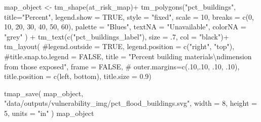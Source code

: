 \documentclass[
  letterpaper,
  DIV=11,
  numbers=noendperiod]{scrartcl}
\newenvironment{Shaded}{}{}
\newcommand{\AttributeTok}[1]{\textcolor[rgb]{0.84,0.23,0.29}{#1}}
\newcommand{\CommentTok}[1]{\textcolor[rgb]{0.42,0.45,0.49}{#1}}
\newcommand{\ConstantTok}[1]{\textcolor[rgb]{0.00,0.36,0.77}{#1}}
\newcommand{\DecValTok}[1]{\textcolor[rgb]{0.00,0.36,0.77}{#1}}
\newcommand{\FloatTok}[1]{\textcolor[rgb]{0.00,0.36,0.77}{#1}}
\newcommand{\FunctionTok}[1]{\textcolor[rgb]{0.44,0.26,0.76}{#1}}
\newcommand{\NormalTok}[1]{\textcolor[rgb]{0.14,0.16,0.18}{#1}}
\newcommand{\OtherTok}[1]{\textcolor[rgb]{0.44,0.26,0.76}{#1}}
\newcommand{\SpecialCharTok}[1]{\textcolor[rgb]{0.00,0.36,0.77}{#1}}
\newcommand{\StringTok}[1]{\textcolor[rgb]{0.01,0.18,0.38}{#1}}
\begin{document}
\begin{Shaded}
\begin{Highlighting}[]
\NormalTok{map\_object }\OtherTok{\textless{}{-}}
\FunctionTok{tm\_shape}\NormalTok{(at\_risk\_map)}\SpecialCharTok{+}
  \FunctionTok{tm\_polygons}\NormalTok{(}\StringTok{"pct\_buildings"}\NormalTok{,}
              \AttributeTok{title=}\StringTok{"Percent"}\NormalTok{, }
              \AttributeTok{legend.show =} \ConstantTok{TRUE}\NormalTok{,}
              \AttributeTok{style =} \StringTok{"fixed"}\NormalTok{,}
              \AttributeTok{scale =} \DecValTok{10}\NormalTok{,}
              \AttributeTok{breaks =} \FunctionTok{c}\NormalTok{(}\DecValTok{0}\NormalTok{, }\DecValTok{10}\NormalTok{, }\DecValTok{20}\NormalTok{, }\DecValTok{30}\NormalTok{, }\DecValTok{40}\NormalTok{, }\DecValTok{50}\NormalTok{, }\DecValTok{60}\NormalTok{),}
              \AttributeTok{palette =} \StringTok{"Blues"}\NormalTok{,}
              \AttributeTok{textNA =} \StringTok{"Unavailable"}\NormalTok{,}
              \AttributeTok{colorNA =} \StringTok{"grey"}
\NormalTok{              ) }\SpecialCharTok{+}
  \FunctionTok{tm\_text}\NormalTok{(}\FunctionTok{c}\NormalTok{(}\StringTok{"pct\_buildings\_label"}\NormalTok{), }\AttributeTok{size =}\NormalTok{ .}\DecValTok{7}\NormalTok{, }\AttributeTok{col =} \StringTok{"black"}\NormalTok{)}\SpecialCharTok{+}
  \FunctionTok{tm\_layout}\NormalTok{(}
    \CommentTok{\#legend.outside = TRUE,}
    \AttributeTok{legend.position =} \FunctionTok{c}\NormalTok{(}\StringTok{"right"}\NormalTok{, }\StringTok{"top"}\NormalTok{),}
    \CommentTok{\#title.snap.to.legend = FALSE,}
    \AttributeTok{title =} 
      \StringTok{"Percent building materials}\SpecialCharTok{\textbackslash{}n}\StringTok{dimension from those exposed"}\NormalTok{,}
    \AttributeTok{frame =} \ConstantTok{FALSE}\NormalTok{,}
\CommentTok{\#            outer.margins=c(.10,.10, .10, .10), }
            \AttributeTok{title.position =} \FunctionTok{c}\NormalTok{(}\StringTok{\textquotesingle{}left\textquotesingle{}}\NormalTok{, }\StringTok{\textquotesingle{}bottom\textquotesingle{}}\NormalTok{),}
            \AttributeTok{title.size =} \FloatTok{0.9}\NormalTok{)}

\FunctionTok{tmap\_save}\NormalTok{(}
\NormalTok{  map\_object,}
  \StringTok{"data/outputs/vulnerability\_img/pct\_flood\_buildings.svg"}\NormalTok{,}
  \AttributeTok{width =} \DecValTok{8}\NormalTok{,}
  \AttributeTok{height =} \DecValTok{5}\NormalTok{,}
  \AttributeTok{units =} \StringTok{"in"}
\NormalTok{)}
\NormalTok{map\_object}
\end{Highlighting}
\end{Shaded}
\end{document}
